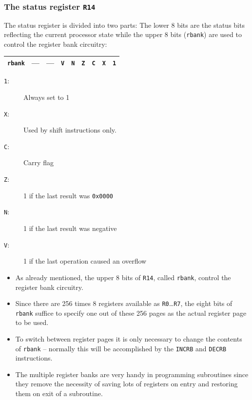 \documentclass{beamer}
\begin{document}
   \begin{frame}
    \frametitle{The status register {\tt R14}}
    The status register is divided into two parts: The lower
    8 bits are the status bits reflecting the current processor
    state while the upper 8 bits ({\tt rbank}) are used to control 
    the register bank circuitry:
    \begin{center}
     \begin{tabular}{|c||c|c|c|c|c|c|c|c|}
      \hline
       {\tt rbank}&
       ---&---&{\tt V}&{\tt N}&{\tt Z}&{\tt C}&{\tt X}&{\tt 1}\\
      \hline
     \end{tabular}
    \end{center}
    \begin{description}
     \item [{\tt 1}:] Always set to 1
     \item [{\tt X}:] Used by shift instructions only.
     \item [{\tt C}:] Carry flag
     \item [{\tt Z}:] 1 if the last result was {\tt 0x0000}
     \item [{\tt N}:] 1 if the last result was negative
     \item [{\tt V}:] 1 if the last operation caused an overflow
    \end{description}
   \end{frame}
%
   \begin{frame}
    \begin{itemize}
     \item As already mentioned, the upper 8 bits of {\tt R14}, called
      {\tt rbank}, control the register bank circuitry.
     \item Since there are 256 times 8 registers available as 
      {\tt R0}\dots{\tt R7}, the eight bits of {\tt rbank} suffice to
      specify one out of these 256 pages as the actual register page
      to be used.
     \item To switch between register pages it is only necessary to 
      change the contents of {\tt rbank} -- normally this will be 
      accomplished by the {\tt INCRB} and {\tt DECRB} instructions.
     \item The multiple register banks are very handy in programming
      subroutines since they remove the necessity of saving lots of
      registers on entry and restoring them on exit of a subroutine.
    \end{itemize}
   \end{frame}
\end{document}
